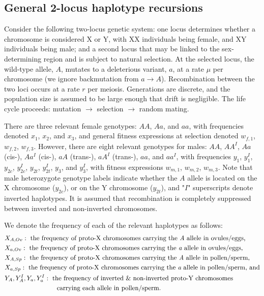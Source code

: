 \documentclass{article}
\begin{document}
\begin{appendices}
\subsection{General 2-locus haplotype recursions}

Consider the following two-locus genetic system: one locus determines whether a chromosome is considered X or Y, with XX individuals being female, and XY individuals being male; and a second locus that may be linked to the sex-determining region and is subject to natural selection. At the selected locus, the wild-type allele, $A$, mutates to a deleterious variant, $a$, at a rate $\mu$ per chromosome (we ignore backmutation from $a \rightarrow A$). Recombination between the two loci occurs at a rate $r$ per meiosis. Generations are discrete, and the population size is assumed to be large enough that drift is negligible. The life cycle proceeds: mutation $\rightarrow$ selection $\rightarrow$ random mating.

There are three relevant female genotypes: $AA$, $Aa$, and $aa$, with frequencies denoted $x_1$, $x_2$, and $x_3$, and general fitness expressions at selection denoted $w_{f,1}$, $w_{f,2}$, $w_{f,3}$. However, there are eight relevant genotypes for males: $AA$, $AA^I$, $Aa$ (cis-), $Aa^I$ (cis-), $aA$ (trans-), $aA^I$ (trans-), $aa$, and $aa^I$, with frequencies $y_{1}$, $y^I_{1}$, $y_{2c}$, $y^I_{2c}$, $y_{2t}$, $y^I_{2t}$, $y_{3}$, and $y^I_{3}$, with fitness expressions $w_{m,1}$, $w_{m,2}$, $w_{m,3}$. Note that male heterozygote genotype labels indicate whether the $A$ allele is located on the X chromosome ($y_{2c}$), or on the Y chromosome ($y_{2t}$), and "$I$" superscripts denote inverted haplotypes. It is assumed that recombination is completely suppressed between inverted and non-inverted chromosomes. 

We denote the frequency of each of the relevant haplotypes as follows: 
\begin{align*}
	&X_{A,Ov}:~\text{the frequency of proto-X chromosomes carrying the {\itshape A} allele in ovules/eggs,}\\ 
	&X_{a,Ov}:~\text{the frequency of proto-X chromosomes carrying the {\itshape a} allele in ovules/eggs,}\\ 
	&X_{A,Sp}:~\text{the frequency of proto-X chromosomes carrying the {\itshape A} allele in pollen/sperm,}\\ 
	&X_{a,Sp}:~\text{the frequency of proto-X chromosomes carrying the {\itshape a} allele in pollen/sperm, and}\\ 
	&Y_A, Y_A^{I}, Y_a, Y_a^{I}:~\text{the frequency of inverted \& non-inverted proto-Y chromosomes}\\ &~~~~~~~~~~~~~~~~~~~~~~~~\text{carrying each allele in pollen/sperm.}
\end{align*}


\end{appendices}
\end{document}
